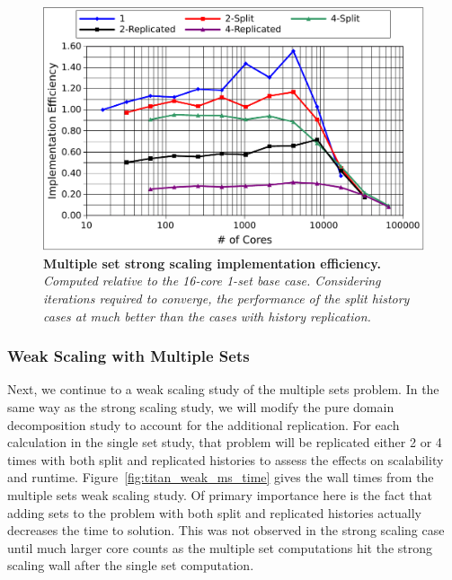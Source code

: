 \begin{figure}[t!]
  \begin{center}
    \includegraphics[width=5in]{chapters/parallel_mc/titan_strong_ms_impeff.pdf}
  \end{center}
  \caption{\textbf{Multiple set strong scaling implementation
      efficiency.} \textit{Computed relative to the 16-core 1-set base
      case. Considering iterations required to converge, the
      performance of the split history cases at much better than the
      cases with history replication.}}
  \label{fig:titan_strong_ms_impeff}
\end{figure}

\clearpage

\subsubsection{Weak Scaling with Multiple Sets}
\label{subsubsec:ms_weak}

Next, we continue to a weak scaling study of the multiple sets
problem. In the same way as the strong scaling study, we will modify
the pure domain decomposition study to account for the additional
replication. For each calculation in the single set study, that
problem will be replicated either 2 or 4 times with both split and
replicated histories to assess the effects on scalability and
runtime. Figure~\ref{fig:titan_weak_ms_time} gives the wall times from
the multiple sets weak scaling study. Of primary importance here is
the fact that adding sets to the problem with both split and
replicated histories actually decreases the time to solution. This was
not observed in the strong scaling case until much larger core counts
as the multiple set computations hit the strong scaling wall after the
single set computation.

